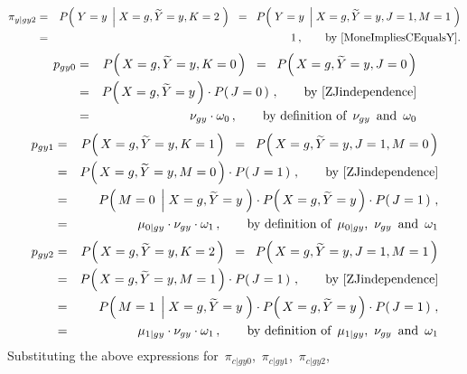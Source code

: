 \begin{enumerate}
\begin{eqnarray*}
\pi_{y \vert gy2}
&=&
	P\!\left(\;Y=y\;\left\vert\;X=g,\widetilde{Y}=y,K=2\right.\,\right)
\;\;=\;\;
	P\!\left(\;Y=y\;\left\vert\;X=g,\widetilde{Y}=y,J=1,M=1\right.\,\right)
\\
&=&
	1\,,
	\quad\quad
	\textnormal{by \eqref{MoneImpliesCEqualsY}.}
\end{eqnarray*}
\begin{eqnarray*}
p_{gy0}
&=&
	P\!\left(\,X=g,\widetilde{Y}=y,K=0\,\right)
\;\;=\;\;
	P\!\left(\,X=g,\widetilde{Y}=y,J=0\,\right)
\\
&=&
	P\!\left(\,X=g,\widetilde{Y}=y\,\right)
	\cdot
	P\!\left(\,J=0\,\right)\,,
	\quad\quad
	\textnormal{by \eqref{ZJindependence}}
\\
&=&
	\nu_{gy}
	\cdot
	\omega_{0}\,,
	\quad\quad
	\textnormal{by definition of \,$\nu_{gy}$\, and \,$\omega_{0}$}
\end{eqnarray*}
\begin{eqnarray*}
p_{gy1}
&=&
	P\!\left(\,X=g,\widetilde{Y}=y,K=1\,\right)
\;\;=\;\;
	P\!\left(\,X=g,\widetilde{Y}=y,J=1,M=0\,\right)
\\
&=&
	P\!\left(\,X=g,\widetilde{Y}=y,M=0\,\right)
	\cdot
	P\!\left(\,J=1\,\right)\,,
	\quad\quad
	\textnormal{by \eqref{ZJindependence}}
\\
&=&
	P\!\left(\,M=0\;\left\vert\;X=g,\widetilde{Y}=y\right.\,\right)
	\cdot
	P\!\left(\,X=g,\widetilde{Y}=y\,\right)
	\cdot
	P\!\left(\,J=1\,\right)\,,
\\
&=&
	\mu_{0 \vert gy}
	\cdot
	\nu_{gy}
	\cdot
	\omega_{1}\,,
	\quad\quad
	\textnormal{by definition of \,$\mu_{0 \vert gy}$, \,$\nu_{gy}$\, and \,$\omega_{1}$}
\end{eqnarray*}
\begin{eqnarray*}
p_{gy2}
&=&
	P\!\left(\,X=g,\widetilde{Y}=y,K=2\,\right)
\;\;=\;\;
	P\!\left(\,X=g,\widetilde{Y}=y,J=1,M=1\,\right)
\\
&=&
	P\!\left(\,X=g,\widetilde{Y}=y,M=1\,\right)
	\cdot
	P\!\left(\,J=1\,\right)\,,
	\quad\quad
	\textnormal{by \eqref{ZJindependence}}
\\
&=&
	P\!\left(\,M=1\;\left\vert\;X=g,\widetilde{Y}=y\right.\,\right)
	\cdot
	P\!\left(\,X=g,\widetilde{Y}=y\,\right)
	\cdot
	P\!\left(\,J=1\,\right)\,,
\\
&=&
	\mu_{1 \vert gy}
	\cdot
	\nu_{gy}
	\cdot
	\omega_{1}\,,
	\quad\quad
	\textnormal{by definition of \,$\mu_{1 \vert gy}$, \,$\nu_{gy}$\, and \,$\omega_{1}$}
\end{eqnarray*}
Substituting the above expressions for
\,$\pi_{c \vert gy0}$,
\,$\pi_{c \vert gy1}$,
\,$\pi_{c \vert gy2}$,

\end{enumerate}
